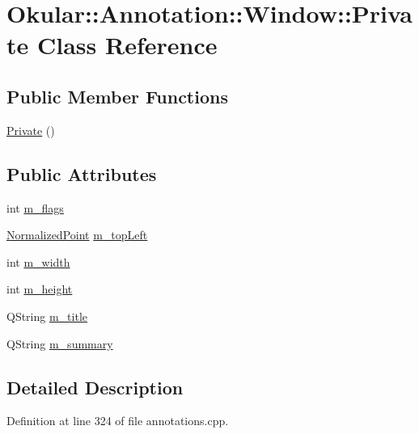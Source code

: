 \hypertarget{classAnnotation_1_1Window_1_1Private}{\section{Okular\+:\+:Annotation\+:\+:Window\+:\+:Private Class Reference}
\label{classAnnotation_1_1Window_1_1Private}
}
\subsection*{Public Member Functions}
\begin{DoxyCompactItemize}
\item 
\hyperlink{classAnnotation_1_1Window_1_1Private_ac50fe24996d2eb3979c88edb5c17152a}{Private} ()
\end{DoxyCompactItemize}
\subsection*{Public Attributes}
\begin{DoxyCompactItemize}
\item 
int \hyperlink{classAnnotation_1_1Window_1_1Private_aa2606a2f610c40c5e37ff673fecf58cc}{m\+\_\+flags}
\item 
\hyperlink{classOkular_1_1NormalizedPoint}{Normalized\+Point} \hyperlink{classAnnotation_1_1Window_1_1Private_a76b52c687c1f0e188e6f717f1f52717e}{m\+\_\+top\+Left}
\item 
int \hyperlink{classAnnotation_1_1Window_1_1Private_ad0a73e95d3ff2d3e702892c375a9efaa}{m\+\_\+width}
\item 
int \hyperlink{classAnnotation_1_1Window_1_1Private_a8cfe2b5dc068db7c9577d59a6eec6777}{m\+\_\+height}
\item 
Q\+String \hyperlink{classAnnotation_1_1Window_1_1Private_a6fc5ee6ecc332374e8aa14aa35231479}{m\+\_\+title}
\item 
Q\+String \hyperlink{classAnnotation_1_1Window_1_1Private_af86162a20b353853fb2105e177ea176c}{m\+\_\+summary}
\end{DoxyCompactItemize}


\subsection{Detailed Description}


Definition at line 324 of file annotations.\+cpp.



